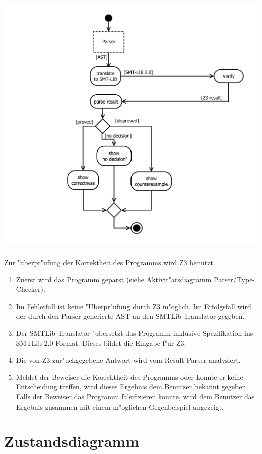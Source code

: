 \documentclass[10pt,a4paper,titlepage]{article}
\begin{document}
\includegraphics[scale=0.5]{images/AktivitaetSMTTranslator.pdf}\\\\
Zur "uberpr"ufung der Korrektheit des Programms wird Z3 benutzt. 
\begin{enumerate}
\item Zuerst wird das Programm geparst (siehe Aktivit"atsdiagramm Parser/Type-Checker).
\item Im Fehlerfall ist keine "Uberpr"ufung durch Z3 m"oglich. Im Erfolgsfall wird der durch den Parser generierte AST an den SMTLib-Translator gegeben.
\item Der SMTLib-Translator "ubersetzt das Programm inklusive Spezifikation ins SMTLib-2.0-Format. Dieses bildet die Eingabe f"ur Z3.
\item Die von Z3 zur"uckgegebene Antwort wird vom Result-Parser analysiert.
\item Meldet der Beweiser die Korrektheit des Programms oder konnte er keine Entscheidung treffen, wird dieses Ergebnis dem Benutzer bekannt gegeben. Falls der Beweiser das Programm falsifizieren konnte, wird dem Benutzer das Ergebnis zusammen mit einem m"oglichen Gegenbeispiel angezeigt.
\end{enumerate}

\section{Zustandsdiagramm}
\end{document}
